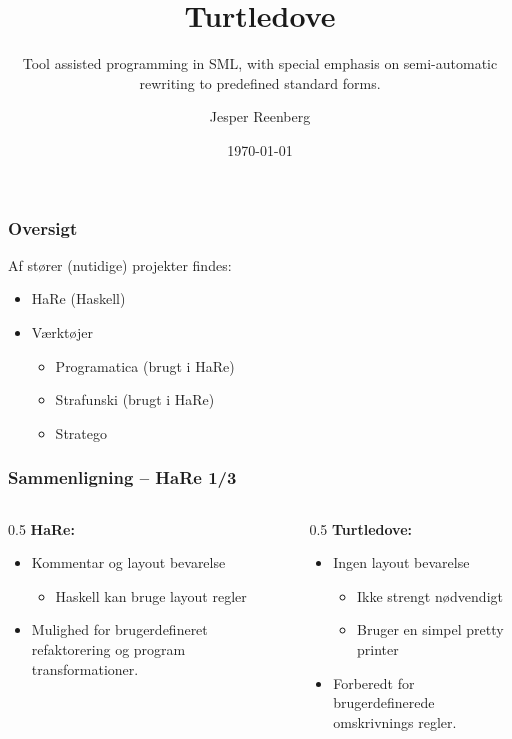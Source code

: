 \documentclass[slidestop,compress,mathserif, xcolor=dvipsnames]{beamer}
\title[]{Turtledove}
\subtitle{\tiny{Tool assisted programming in SML, with special emphasis on
    semi-automatic\\ rewriting to predefined standard forms.}}
\author{Jesper Reenberg}
\institute[DIKU]{Department of Computer Science}
\date[]{\today}
\begin{document}
\frame[plain]{\titlepage}

\begin{frame}[c]
  \frametitle{Oversigt}  
  Af stører (nutidige) projekter findes:
  
  \begin{itemize}
  \item HaRe {\footnotesize{(Haskell)}}
    
  \item Værktøjer       
    \begin{itemize}
    \item Programatica {\footnotesize{(brugt i HaRe)}}
    \item Strafunski {\footnotesize{(brugt i HaRe)}}
    \item Stratego
    \end{itemize}       
  \end{itemize}

\end{frame}

\begin{frame}[c]
  \frametitle{Sammenligning -- HaRe 1/3}  

  \begin{columns}    
    \begin{column}{0.5\textwidth{}}
      \textbf{HaRe:}
      \begin{itemize}
      \item Kommentar og layout bevarelse 
        \begin{itemize}
        \item Haskell kan bruge layout regler
        \end{itemize}    
      \item Mulighed for brugerdefineret refaktorering og program transformationer.      
      \end{itemize}      
    \end{column}
    \begin{column}{0.5\textwidth{}}
      \textbf{Turtledove:}
      \begin{itemize}
      \item Ingen layout bevarelse 
        \begin{itemize}
        \item Ikke strengt nødvendigt
        \item Bruger en simpel pretty printer
        \end{itemize}
      \item Forberedt for brugerdefinerede omskrivnings regler.
      \end{itemize}
    \end{column}
  \end{columns}
\end{frame}
\end{document}
